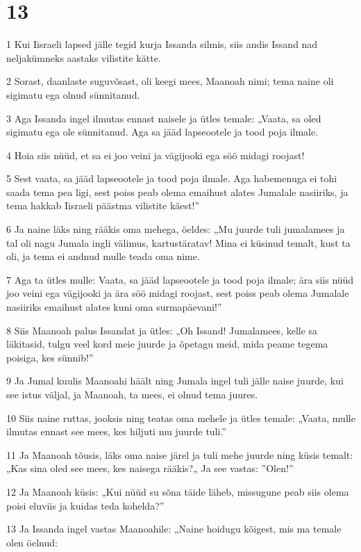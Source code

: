 \chapter{13}

\par 1 Kui Iisraeli lapsed jälle tegid kurja Issanda silmis, siis andis Issand nad neljakümneks aastaks vilistite kätte.
\par 2 Sorast, daanlaste suguvõsast, oli keegi mees, Maanoah nimi; tema naine oli sigimatu ega olnud sünnitanud.
\par 3 Aga Issanda ingel ilmutas ennast naisele ja ütles temale: „Vaata, sa oled sigimatu ega ole sünnitanud. Aga sa jääd lapseootele ja tood poja ilmale.
\par 4 Hoia siis nüüd, et sa ei joo veini ja vägijooki ega söö midagi roojast!
\par 5 Sest vaata, sa jääd lapseootele ja tood poja ilmale. Aga habemenuga ei tohi saada tema pea ligi, sest poiss peab olema emaihust alates Jumalale nasiiriks, ja tema hakkab Iisraeli päästma vilistite käest!”
\par 6 Ja naine läks ning rääkis oma mehega, öeldes: „Mu juurde tuli jumalamees ja tal oli nagu Jumala ingli välimus, kartustäratav! Mina ei küsinud temalt, kust ta oli, ja tema ei andnud mulle teada oma nime.
\par 7 Aga ta ütles mulle: Vaata, sa jääd lapseootele ja tood poja ilmale; ära siis nüüd joo veini ega vägijooki ja ära söö midagi roojast, sest poiss peab olema Jumalale nasiiriks emaihust alates kuni oma surmapäevani!”
\par 8 Siis Maanoah palus Issandat ja ütles: „Oh Issand! Jumalamees, kelle sa läkitasid, tulgu veel kord meie juurde ja õpetagu meid, mida peame tegema poisiga, kes sünnib!”
\par 9 Ja Jumal kuulis Maanoahi häält ning Jumala ingel tuli jälle naise juurde, kui see istus väljal, ja Maanoah, ta mees, ei olnud tema juures.
\par 10 Siis naine ruttas, jooksis ning teatas oma mehele ja ütles temale: „Vaata, mulle ilmutas ennast see mees, kes hiljuti mu juurde tuli.”
\par 11 Ja Maanoah tõusis, läks oma naise järel ja tuli mehe juurde ning küsis temalt: „Kas sina oled see mees, kes naisega rääkis?„ Ja see vastas: ”Olen!”
\par 12 Ja Maanoah küsis: „Kui nüüd su sõna täide läheb, missugune peab siis olema poisi eluviis ja kuidas teda kohelda?”
\par 13 Ja Issanda ingel vastas Maanoahile: „Naine hoidugu kõigest, mis ma temale olen öelnud:
